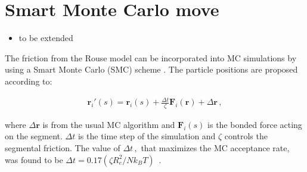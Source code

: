 \documentclass[bachelor,       %
               twoside,        %
               BCOR10mm,       %
               ngerman, english %
               ]{GAUBM}
\begin{document}




\section{Smart Monte Carlo move}

\begin{itemize}
    \item to be extended
\end{itemize}
The friction from the Rouse model can be incorporated into MC simulations by using a Smart Monte Carlo (SMC) scheme \cite{SMC}. The particle positions are proposed according to:

\begin{align}
    \mathbf{r}_i'(s)=\mathbf{r}_i(s)+\frac{\Delta t}{\zeta}\mathbf F_i(\mathbf r)+\Delta \mathbf r\,,
\end{align}

where $\Delta \mathbf r$ is from the usual MC algorithm and $\mathbf F_i(s)$ is the bonded force acting on the segment. $\Delta t$ is the time step of the simulation and $\zeta$ controls the segmental friction. The value of $\Delta t\,,$ that maximizes the MC acceptance rate, was found to be $\Delta t=0.17(\zeta R_e^2/Nk_BT)\,$ \cite{mueller_deltat}.
\end{document}
